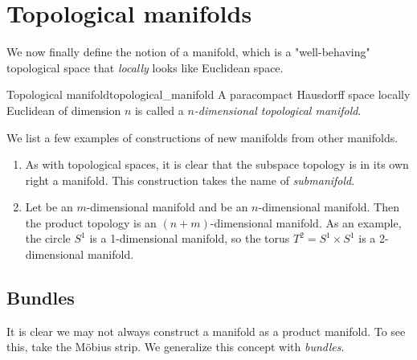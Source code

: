 \section{Topological manifolds}

We now finally define the notion of a manifold, which is a "well-behaving" topological space that \emph{locally} looks like Euclidean space.

\begin{definition}{Topological manifold}{topological_manifold}
    A paracompact Hausdorff space  locally Euclidean of dimension \(n\) is called a \emph{\(n\)-dimensional topological manifold}.
\end{definition}

\begin{example}
    We list a few examples of constructions of new manifolds from other manifolds.
    \begin{enumerate}[label=(\alph*)]
        \item As with topological spaces, it is clear that the subspace topology  is in its own right a manifold. This construction takes the name of \emph{submanifold}.
        \item Let  be an \(m\)-dimensional manifold and  be an \(n\)-dimensional manifold. Then the product topology  is an \((n+m)\)-dimensional manifold. As an example, the circle \(S^1\) is a 1-dimensional manifold, so the torus \(T^2 = S^1 \times S^1\) is a 2-dimensional manifold.
    \end{enumerate}
\end{example}

\subsection{Bundles}

It is clear we may not always construct a manifold as a product manifold. To see this, take the Möbius strip. %
We generalize this concept with \emph{bundles}.

